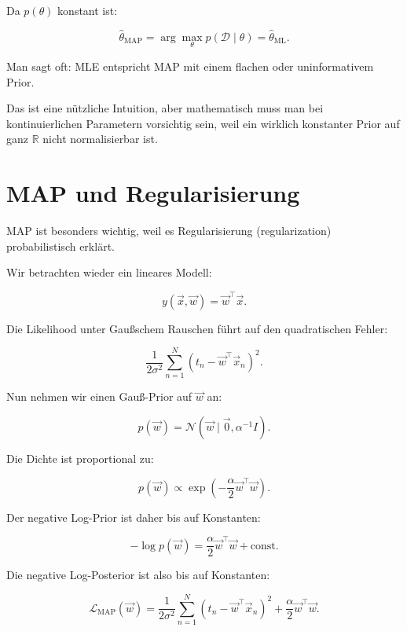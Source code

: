 Da \(p(\theta)\) konstant ist:

\[
    \hat{\theta}_{\mathrm{MAP}}
    =
    \arg\max_{\theta}
    p(\mathcal{D} \mid \theta)
    =
    \hat{\theta}_{\mathrm{ML}}.
\]

\begin{notebox}
Man sagt oft:
MLE entspricht MAP mit einem flachen oder uninformativem Prior.

Das ist eine nützliche Intuition, aber mathematisch muss man bei kontinuierlichen Parametern vorsichtig sein, weil ein wirklich konstanter Prior auf ganz \(\mathbb{R}\) nicht normalisierbar ist.
\end{notebox}

\section{MAP und Regularisierung}

MAP ist besonders wichtig, weil es Regularisierung (regularization) probabilistisch erklärt.

Wir betrachten wieder ein lineares Modell:

\[
    y(\vec{x},\vec{w})
    =
    \vec{w}^{\top}\vec{x}.
\]

Die Likelihood unter Gaußschem Rauschen führt auf den quadratischen Fehler:

\[
    \frac{1}{2\sigma^2}
    \sum_{n=1}^{N}
    \left(
        t_n
        -
        \vec{w}^{\top}\vec{x}_n
    \right)^2.
\]

Nun nehmen wir einen Gauß-Prior auf \(\vec{w}\) an:

\[
    p(\vec{w})
    =
    \mathcal{N}
    \left(
        \vec{w}
        \mid
        \vec{0},
        \alpha^{-1}I
    \right).
\]

Die Dichte ist proportional zu:

\[
    p(\vec{w})
    \propto
    \exp\left(
        -\frac{\alpha}{2}
        \vec{w}^{\top}\vec{w}
    \right).
\]

Der negative Log-Prior ist daher bis auf Konstanten:

\[
    -\log p(\vec{w})
    =
    \frac{\alpha}{2}
    \vec{w}^{\top}\vec{w}
    +
    \text{const}.
\]

Die negative Log-Posterior ist also bis auf Konstanten:

\[
    \mathcal{L}_{\mathrm{MAP}}(\vec{w})
    =
    \frac{1}{2\sigma^2}
    \sum_{n=1}^{N}
    \left(
        t_n
        -
        \vec{w}^{\top}\vec{x}_n
    \right)^2
    +
    \frac{\alpha}{2}
    \vec{w}^{\top}\vec{w}.
\]

